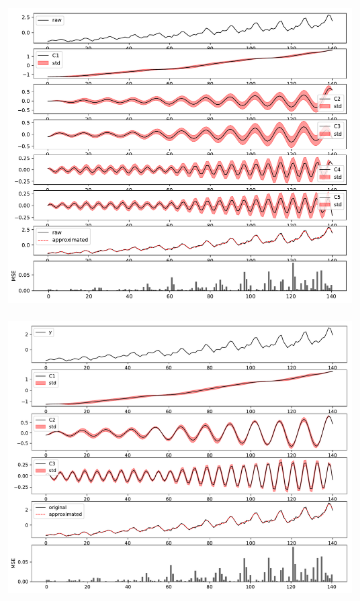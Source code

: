 \documentclass{article}
\begin{document}
\begin{figure}
  \begin{subfigure}{0.5\textwidth}
    \centering
    \includegraphics[scale=0.23]{figures/fig2a}
    \caption{}
    \label{fig:f2a}
  \end{subfigure}%
  \hspace{3mm}
  \begin{subfigure}{0.5\textwidth}
    \centering
    \includegraphics[scale=0.23]{figures/fig1a}
    \caption{}
    \label{fig:f1a}
  \end{subfigure}
  \vspace{4mm}


\end{figure}
\end{document}

